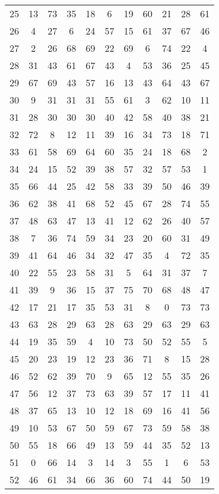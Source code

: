 \begin{table}
\begin{tabular}{c c c c c c c c c c c }
25 & 13 & 73 & 35 & 18 & 6 & 19 & 60 & 21 & 28 & 61 \\
26 & 4 & 27 & 6 & 24 & 57 & 15 & 61 & 37 & 67 & 46 \\
27 & 2 & 26 & 68 & 69 & 22 & 69 & 6 & 74 & 22 & 4 \\
28 & 31 & 43 & 61 & 67 & 43 & 4 & 53 & 36 & 25 & 45 \\
29 & 67 & 69 & 43 & 57 & 16 & 13 & 43 & 64 & 43 & 67 \\
30 & 9 & 31 & 31 & 31 & 55 & 61 & 3 & 62 & 10 & 11 \\
31 & 28 & 30 & 30 & 30 & 40 & 42 & 58 & 40 & 38 & 21 \\
32 & 72 & 8 & 12 & 11 & 39 & 16 & 34 & 73 & 18 & 71 \\
33 & 61 & 58 & 69 & 64 & 60 & 35 & 24 & 18 & 68 & 2 \\
34 & 24 & 15 & 52 & 39 & 38 & 57 & 32 & 57 & 53 & 1 \\
35 & 66 & 44 & 25 & 42 & 58 & 33 & 39 & 50 & 46 & 39 \\
36 & 62 & 38 & 41 & 68 & 52 & 45 & 67 & 28 & 74 & 55 \\
37 & 48 & 63 & 47 & 13 & 41 & 12 & 62 & 26 & 40 & 57 \\
38 & 7 & 36 & 74 & 59 & 34 & 23 & 20 & 60 & 31 & 49 \\
39 & 41 & 64 & 46 & 34 & 32 & 47 & 35 & 4 & 72 & 35 \\
40 & 22 & 55 & 23 & 58 & 31 & 5 & 64 & 31 & 37 & 7 \\
41 & 39 & 9 & 36 & 15 & 37 & 75 & 70 & 68 & 48 & 47 \\
42 & 17 & 21 & 17 & 35 & 53 & 31 & 8 & 0 & 73 & 73 \\
43 & 63 & 28 & 29 & 63 & 28 & 63 & 29 & 63 & 29 & 63 \\
44 & 19 & 35 & 59 & 4 & 10 & 73 & 50 & 52 & 55 & 5 \\
45 & 20 & 23 & 19 & 12 & 23 & 36 & 71 & 8 & 15 & 28 \\
46 & 52 & 62 & 39 & 70 & 9 & 65 & 12 & 55 & 35 & 26 \\
47 & 56 & 12 & 37 & 73 & 63 & 39 & 57 & 17 & 11 & 41 \\
48 & 37 & 65 & 13 & 10 & 12 & 18 & 69 & 16 & 41 & 56 \\
49 & 10 & 53 & 67 & 50 & 59 & 67 & 73 & 59 & 58 & 38 \\
50 & 55 & 18 & 66 & 49 & 13 & 59 & 44 & 35 & 52 & 13 \\
51 & 0 & 66 & 14 & 3 & 14 & 3 & 55 & 1 & 6 & 53 \\
52 & 46 & 61 & 34 & 66 & 36 & 60 & 74 & 44 & 50 & 19 \\

\end{tabular}
\end{table}
